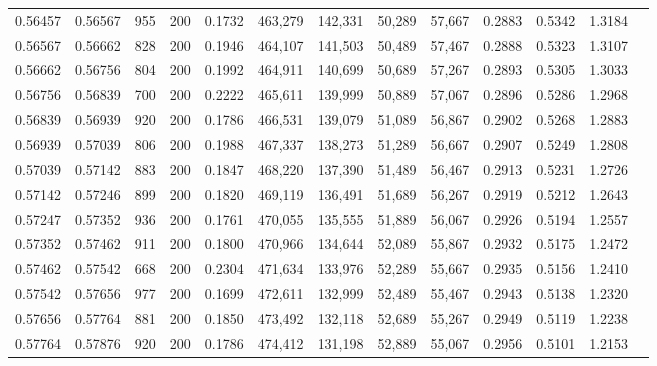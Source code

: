 \begin{tabular}{rrrrrrrrrrrrr}
0.56457 & 0.56567 &   955 & 200 &                                     0.1732 & 463,279 & 142,331 &  50,289 &  57,667 & 0.2883 & 0.5342 & 1.3184 \\
0.56567 & 0.56662 &   828 & 200 &                                     0.1946 & 464,107 & 141,503 &  50,489 &  57,467 & 0.2888 & 0.5323 & 1.3107 \\
0.56662 & 0.56756 &   804 & 200 &                                     0.1992 & 464,911 & 140,699 &  50,689 &  57,267 & 0.2893 & 0.5305 & 1.3033 \\
0.56756 & 0.56839 &   700 & 200 &                                     0.2222 & 465,611 & 139,999 &  50,889 &  57,067 & 0.2896 & 0.5286 & 1.2968 \\
0.56839 & 0.56939 &   920 & 200 &                                     0.1786 & 466,531 & 139,079 &  51,089 &  56,867 & 0.2902 & 0.5268 & 1.2883 \\
0.56939 & 0.57039 &   806 & 200 &                                     0.1988 & 467,337 & 138,273 &  51,289 &  56,667 & 0.2907 & 0.5249 & 1.2808 \\
0.57039 & 0.57142 &   883 & 200 &                                     0.1847 & 468,220 & 137,390 &  51,489 &  56,467 & 0.2913 & 0.5231 & 1.2726 \\
0.57142 & 0.57246 &   899 & 200 &                                     0.1820 & 469,119 & 136,491 &  51,689 &  56,267 & 0.2919 & 0.5212 & 1.2643 \\
0.57247 & 0.57352 &   936 & 200 &                                     0.1761 & 470,055 & 135,555 &  51,889 &  56,067 & 0.2926 & 0.5194 & 1.2557 \\
0.57352 & 0.57462 &   911 & 200 &                                     0.1800 & 470,966 & 134,644 &  52,089 &  55,867 & 0.2932 & 0.5175 & 1.2472 \\
0.57462 & 0.57542 &   668 & 200 &                                     0.2304 & 471,634 & 133,976 &  52,289 &  55,667 & 0.2935 & 0.5156 & 1.2410 \\
0.57542 & 0.57656 &   977 & 200 &                                     0.1699 & 472,611 & 132,999 &  52,489 &  55,467 & 0.2943 & 0.5138 & 1.2320 \\
0.57656 & 0.57764 &   881 & 200 &                                     0.1850 & 473,492 & 132,118 &  52,689 &  55,267 & 0.2949 & 0.5119 & 1.2238 \\
0.57764 & 0.57876 &   920 & 200 &                                     0.1786 & 474,412 & 131,198 &  52,889 &  55,067 & 0.2956 & 0.5101 & 1.2153 \\

\end{tabular}
